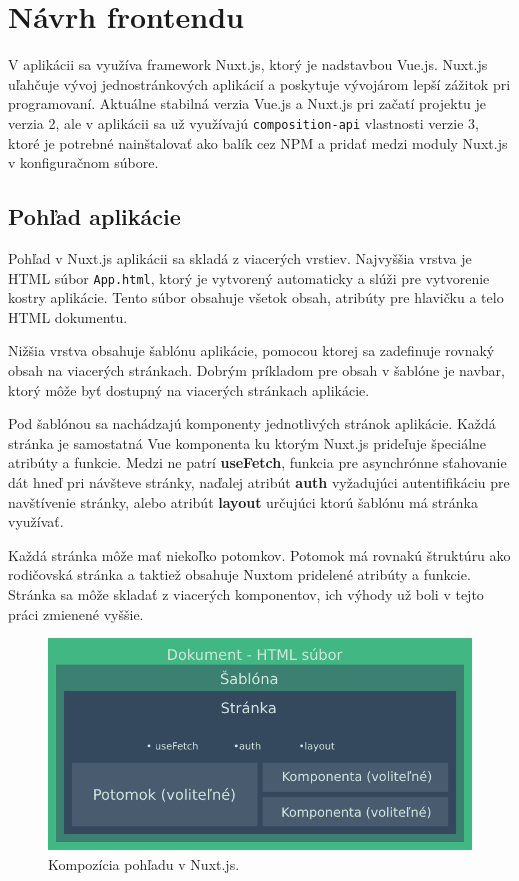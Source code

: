\section{Návrh frontendu}
V aplikácii sa využíva framework Nuxt.js, ktorý je nadstavbou Vue.js. Nuxt.js uľahčuje vývoj jednostránkových aplikácií a poskytuje vývojárom lepší zážitok pri programovaní. 
Aktuálne stabilná verzia Vue.js a Nuxt.js pri začatí projektu je verzia 2, ale v aplikácii sa už využívajú \texttt{composition-api} vlastnosti verzie 3, ktoré je potrebné nainštalovať ako balík cez NPM a pridať medzi moduly Nuxt.js v konfiguračnom súbore.

\subsection{Pohľad aplikácie}
Pohľad v Nuxt.js aplikácii sa skladá z viacerých vrstiev. Najvyššia vrstva je HTML súbor \texttt{App.html}, ktorý je vytvorený automaticky a slúži pre vytvorenie kostry aplikácie. Tento súbor obsahuje všetok obsah, atribúty pre hlavičku a telo HTML dokumentu. 

Nižšia vrstva obsahuje šablónu aplikácie, pomocou ktorej sa zadefinuje rovnaký obsah na viacerých stránkach. Dobrým príkladom pre obsah v šablóne je navbar, ktorý môže byť dostupný na viacerých stránkach aplikácie. 

Pod šablónou sa nachádzajú komponenty jednotlivých stránok aplikácie. Každá stránka je samostatná Vue komponenta ku ktorým Nuxt.js prideľuje špeciálne atribúty a funkcie. Medzi ne patrí \textbf{useFetch}, funkcia pre asynchrónne sťahovanie dát hneď pri návšteve stránky, naďalej atribút \textbf{auth} vyžadujúci autentifikáciu pre navštívenie stránky, alebo atribút \textbf{layout} určujúci ktorú šablónu má stránka využívať.

Každá stránka môže mať niekoľko potomkov. Potomok má rovnakú štruktúru ako rodičovská stránka a taktiež obsahuje Nuxtom pridelené atribúty a funkcie. Stránka sa môže skladať z viacerých komponentov, ich výhody už boli v tejto práci zmienené vyššie.

    \begin{figure}[!hbt]
        \centering
        \includegraphics[scale=0.5]{obrazky/nuxt_struktura.png}
        \caption{Kompozícia pohľadu v Nuxt.js.}
        \label{pic:nuxt_strukture}
    \end{figure}


